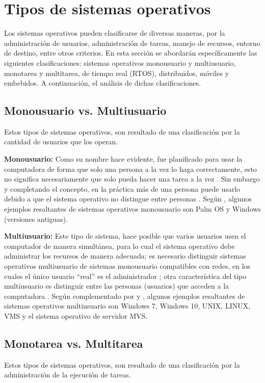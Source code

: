 \section{Tipos de sistemas operativos}
Los sistemas operativos pueden clasificarse de diversas maneras, por la administración de usuarios, administración de tareas, manejo de recursos, entorno de destino, entre otros criterios. En esta sección se abordarán específicamente las siguientes clasificaciones: sistemas operativos monousuario y multiusuario, monotarea y multitarea, de tiempo real (RTOS), distribuidos, móviles y embebidos. A continuación, el análisis de dichas clasificaciones.

\subsection{Monousuario vs. Multiusuario}
Estos tipos de sistemas operativos, son resultado de una clasificación por la cantidad de usuarios que los operan.  

\textbf{Monousuario:} Como su nombre hace evidente, fue planificado para usar la computadora de forma que solo una persona a la vez lo haga correctamente, esto no significa necesariamente que solo pueda hacer una tarea a la vez \citep{kaur2022osreview}. Sin embargo y completando el concepto, en la práctica más de una persona puede usarlo debido a que el sistema operativo no distingue entre personas \citep{olivares2021sohardware}. Según \citep{kaur2022osreview}, algunos ejemplos resaltantes de sistemas operativos monousuario son Palm OS y Windows (versiones antiguas).  

\textbf{Multiusuario:} Este tipo de sistema, hace posible que varios usuarios usen el computador de manera simultánea, para lo cual el sistema operativo debe administrar los recursos de manera adecuada; es necesario distinguir sistemas operativos multiusuario de sistemas monousuario compatibles con redes, en los cuales el único usuario “real” es el administrador \citep{kaur2022osreview}; otra característica del tipo multiusuario es distinguir entre las personas (usuarios) que acceden a la computadora \citep{olivares2021sohardware}. Según \citep{kaur2022osreview} complementado por \citep{olivares2021sohardware} y \citep{kabiraj2018oscase}, algunos ejemplos resaltantes de sistemas operativos multiusuario son Windows 7, Windows 10, UNIX, LINUX, VMS y el sistema operativo de servidor MVS.  

\subsection{Monotarea vs. Multitarea}
Estos tipos de sistemas operativos, son resultado de una clasificación por la administración de la ejecución de tareas.  

